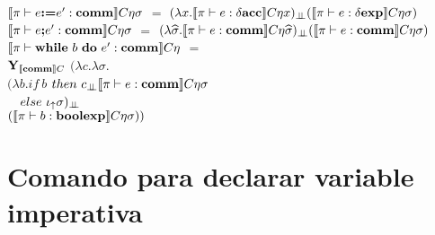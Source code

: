 \noindent
$\llbracket  \pi \vdash e \textbf{:=} e' : \textbf{comm}  \rrbracket C\eta\sigma$ 
$=$ 
$(\lambda x . \llbracket \pi \vdash e : \delta \textbf{acc} \rrbracket C\eta x)_{\bot \!\!\! \bot}
(\llbracket  \pi \vdash e : \delta \textbf{exp}  \rrbracket C\eta\sigma)$\\

\noindent
$\llbracket  \pi \vdash e \textbf{;} e' : \textbf{comm}  \rrbracket C\eta\sigma$ 
$=$ 
$(\lambda \widehat{\sigma} . \llbracket \pi \vdash e : \textbf{comm} \rrbracket C\eta\widehat{\sigma})_{\bot \!\!\! \bot}
(\llbracket  \pi \vdash e : \textbf{comm} \rrbracket C\eta\sigma)$\\

\noindent
$\llbracket  \pi \vdash \textbf{while} \ b \ \textbf{do} \ e' : \textbf{comm}  \rrbracket C\eta$ 
$=$ \\
\indent 
$\textbf{Y}_{\llbracket \textbf{comm} \rrbracket C}$ $(\lambda c . \lambda \sigma .$\\
\indent \indent \indent
$(\lambda b . if \ b $ $then \ c_{\bot \!\!\! \bot} \llbracket \pi \vdash e : \textbf{comm} \rrbracket C\eta\sigma$\\
\indent \indent \indent \indent \indent \ \ 
$else \ \iota_{\uparrow} \sigma)_{\bot \!\!\! \bot}$\\
\indent \indent \indent \indent \indent \indent
$(\llbracket  \pi \vdash b : \textbf{boolexp} \rrbracket C\eta\sigma))$\\

\section{Comando para declarar variable imperativa}









